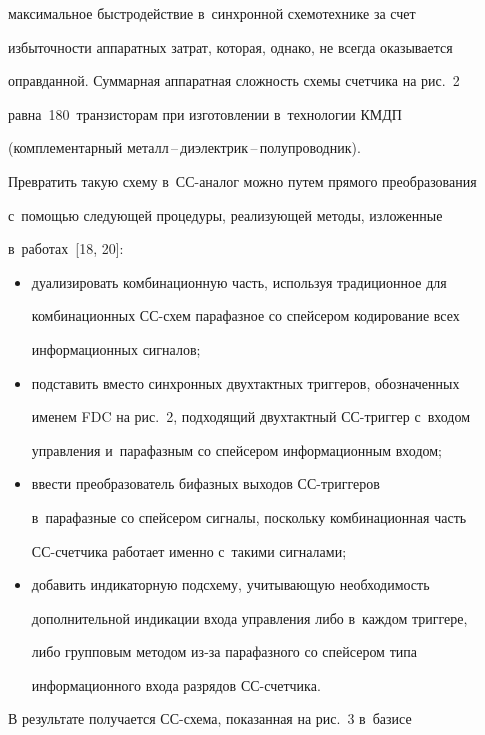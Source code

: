 максимальное быст\-ро\-дей\-ст\-вие в~синхронной схемотехнике за счет 

избыточности аппаратных за\-трат, которая, однако, не всегда оказывается 

оправ\-дан\-ной. Суммарная аппаратная слож\-ность схемы счетчика на рис.~2 

рав\-на~180~транзисторам при изготовлении в~технологии КМДП 

(комплементарный ме\-талл\,--\,ди\-элект\-рик\,--\,по\-лу\-про\-вод\-ник). 

Превратить такую схему в~СС-ана\-лог можно путем прямого преобразования 

с~по\-мощью сле\-ду\-ющей процедуры, ре\-а\-ли\-зу\-ющей методы, изложенные 

в~работах~[18, 20]:

  \begin{itemize}

\item дуализировать комбинационную часть, используя традиционное для 

комбинационных СС-схем парафазное со спейсером кодирование всех 

информационных сигналов;

\item подставить вместо синхронных двухтактных триггеров, обозначенных 

именем FDC на рис.~2, подходящий двухтактный СС-триг\-гер с~входом 

управ\-ле\-ния и~парафазным со спейсером информационным входом; 

\item ввести преобразователь бифазных выходов СС-триг\-ге\-ров 

в~парафазные со спейсером сигналы, поскольку комбинационная часть 

СС-счет\-чи\-ка работает именно с~такими сигналами;

\item добавить индикаторную подсхему, учи\-ты\-ва\-ющую не\-об\-хо\-ди\-мость 

дополнительной индикации входа управ\-ле\-ния либо в~каж\-дом триггере, 

либо групповым методом из-за парафазного со спейсером типа 

информационного входа разрядов СС-счет\-чика. 

\end{itemize}



  В результате получается СС-схе\-ма, показанная на рис.~3 в~базисе 

